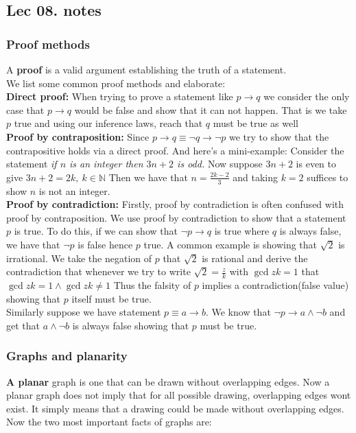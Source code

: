 \documentclass{article}
\theoremstyle{definition}
\numberwithin{equation}{subsection}
\numberwithin{remark}{subsection}
\begin{document}
\subsection{Lec 08. notes}
\subsubsection{Proof methods}
A \textbf{proof} is a valid argument establishing the truth of a statement. 
\\
We list some common proof methods and elaborate:
\\
\textbf{Direct proof:} When trying to prove a statement like $p \rightarrow q$ we consider the only case that $p \rightarrow q$ would be false and show that it can not happen. That is we take $p$ true and using our inference laws, reach that $q$ must be true as well 
\\
\textbf{Proof by contraposition:} Since $p\rightarrow q \equiv \neg q \rightarrow \neg p$ we try to show that the contrapositive holds via a direct proof. And here's a mini-example: Consider the statement \textit{if $n$ is an integer then $3n+2$ is odd.} Now suppose $3n+2$ is even to give $3n+2 = 2k, \ k\in \mathbb{N}$ Then we have that $n=\frac{2k-2}{3}$ and taking $k=2$ suffices to show $n$ is not an integer. 
\\
\textbf{Proof by contradiction:} Firstly, proof by contradiction is often confused with proof by contraposition. We use proof by contradiction to show that a statement $p$ is true. To do this, if we can show that $\neg p \rightarrow q$ is true where $q$ is always false, we have that $\neg p$ is false hence $p$ true. A common example is showing that $\sqrt{2}$ is irrational. We take the negation of $p$ that $\sqrt{2}$ is rational and derive the contradiction that whenever we try to write $\sqrt{2} = \frac{z}{k}$ with $\gcd{z}{k} = 1$ that $\gcd{z}{k} = 1 \land \gcd{z}{k} \not = 1$ Thus the falsity of $p$ implies a contradiction(false value) showing that $p$ itself must be true. 
\\
Similarly suppose we have statement $p\equiv a \rightarrow b$. We know that $\neg p \rightarrow a \land \neg b$ and get that $a\land \neg b$ is always false showing that $p$ must be true. 
\subsubsection{Graphs and planarity}
\textbf{A planar} graph is one that can be drawn without overlapping edges. Now a planar graph does not imply that for all possible drawing, overlapping edges wont exist. It simply means that a drawing could be made without overlapping edges. Now the two most important facts of graphs are:
\end{document}

